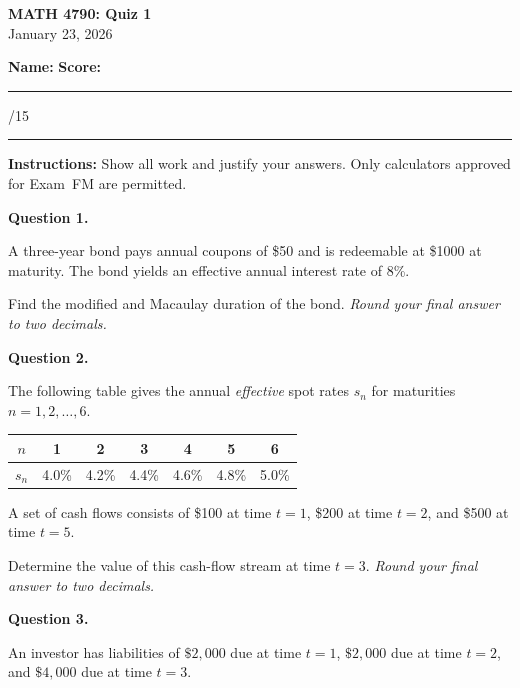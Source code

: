 \documentclass[11pt]{article}
\begin{document}
\begin{center}
    {\Large \textbf{MATH 4790: Quiz 1}}\\[0.3em]
    January 23, 2026
\end{center}


\vspace{1em}

\textbf{Name:} \hfill \textbf{Score:} \rule{1.5cm}{0.4pt}/15

\vspace{1em}

\hrule
\vspace{1em}

\textbf{Instructions:} Show all work and justify your answers. Only calculators approved for Exam~FM are permitted.


\vspace{1em}



\noindent\textbf{Question 1.}  

A three-year bond pays annual coupons of \$50 and is redeemable at \$1000 at maturity. The bond yields an effective annual interest rate of 8\%.

Find the modified and Macaulay duration of the bond. \textit{Round your final answer to two decimals.}



\newpage

\noindent\textbf{Question 2.} 

The following table gives the annual \emph{effective} spot rates $s_n$ for maturities $n=1,2,\dots,6$.

\begin{center}
\renewcommand{\arraystretch}{1.2}
\begin{tabular}{c|cccccc}
$n$ & 1 & 2 & 3 & 4 & 5 & 6\\ \hline
$s_n$ & 4.0\% & 4.2\% & 4.4\% & 4.6\% & 4.8\% & 5.0\%
\end{tabular}
\end{center}

A set of cash flows consists of \$100 at time $t=1$, \$200 at time $t=2$, and \$500 at time $t=5$.

Determine the value of this cash-flow stream at time $t=3$. \textit{Round your final answer to two decimals.}


\newpage

\noindent\textbf{Question 3.}  

An investor has liabilities of $\$2{,}000$ due at time $t=1$, $\$2{,}000$ due at time $t=2$, and $\$4{,}000$ due at time $t=3$.  
\end{document}
